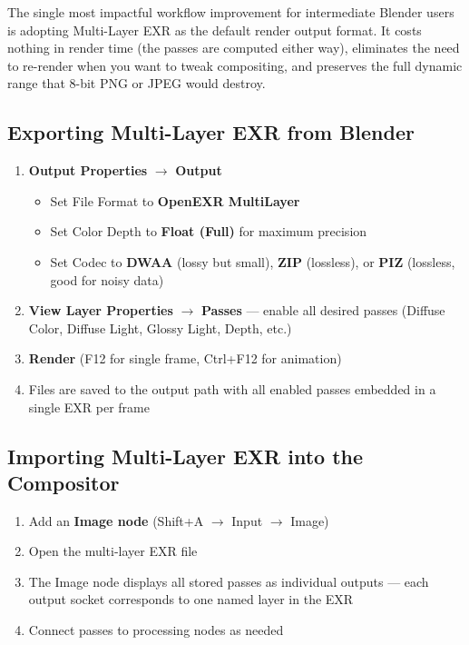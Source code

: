 \begin{tipbox}
The single most impactful workflow improvement for intermediate Blender users is adopting Multi-Layer EXR as the default render output format. It costs nothing in render time (the passes are computed either way), eliminates the need to re-render when you want to tweak compositing, and preserves the full dynamic range that 8-bit PNG or JPEG would destroy.
\end{tipbox}

\subsection{Exporting Multi-Layer EXR from Blender}

\begin{enumerate}[leftmargin=2em]
  \item \textbf{Output Properties} $\rightarrow$ \textbf{Output}
  \begin{itemize}[leftmargin=2em]
    \item Set File Format to \textbf{OpenEXR MultiLayer}
    \item Set Color Depth to \textbf{Float (Full)} for maximum precision
    \item Set Codec to \textbf{DWAA} (lossy but small), \textbf{ZIP} (lossless), or \textbf{PIZ} (lossless, good for noisy data)
  \end{itemize}
  \item \textbf{View Layer Properties} $\rightarrow$ \textbf{Passes} --- enable all desired passes (Diffuse Color, Diffuse Light, Glossy Light, Depth, etc.)
  \item \textbf{Render} (F12 for single frame, Ctrl+F12 for animation)
  \item Files are saved to the output path with all enabled passes embedded in a single EXR per frame
\end{enumerate}

\subsection{Importing Multi-Layer EXR into the Compositor}

\begin{enumerate}[leftmargin=2em]
  \item Add an \textbf{Image node} (Shift+A $\rightarrow$ Input $\rightarrow$ Image)
  \item Open the multi-layer EXR file
  \item The Image node displays all stored passes as individual outputs --- each output socket corresponds to one named layer in the EXR
  \item Connect passes to processing nodes as needed
\end{enumerate}

